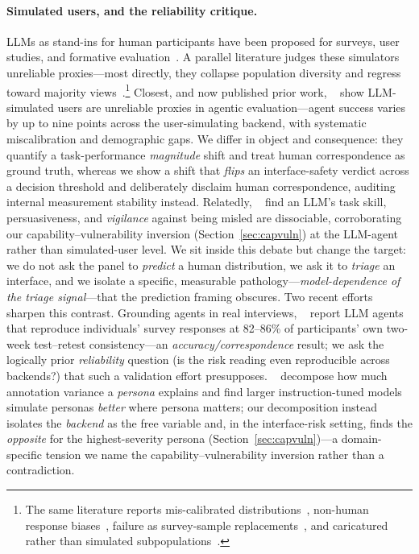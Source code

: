 \documentclass[manuscript,nonacm]{acmart}
\begin{document}
\paragraph{Simulated users, and the reliability critique.} LLMs as stand-ins for human participants have
been proposed for surveys, user studies, and formative
evaluation~\cite{park2022social,argyle2023out,aher2023using}. A parallel literature judges these simulators
unreliable proxies---most directly, they collapse population diversity and regress toward majority
views~\cite{santurkar2023whose}.\footnote{The same literature reports mis-calibrated
distributions~\cite{cao2025specializing,dominguez2024questioning}, non-human response
biases~\cite{tjuatja2024llms}, failure as survey-sample replacements~\cite{bisbee2024synthetic}, and
caricatured rather than simulated subpopulations~\cite{cheng2023compost}.} Closest, and now published prior work,
\citeauthor{seshadri2026lost}~\cite{seshadri2026lost} show LLM-simulated users are unreliable proxies in
agentic evaluation---agent success varies by up to nine points across the user-simulating backend, with
systematic miscalibration and demographic gaps. We differ in object and consequence: they quantify a
task-performance \emph{magnitude} shift and treat human correspondence as ground truth, whereas we show a
shift that \emph{flips} an interface-safety verdict across a decision threshold and deliberately disclaim
human correspondence, auditing internal measurement stability instead. Relatedly,
\citeauthor{robinson2026influence}~\cite{robinson2026influence} find an LLM's task skill, persuasiveness, and
\emph{vigilance} against being misled are dissociable, corroborating our capability--vulnerability inversion
(Section~\ref{sec:capvuln}) at the LLM-agent rather than simulated-user level. We sit inside this debate but change the
target: we do not ask the panel to \emph{predict} a human distribution, we ask it to \emph{triage} an
interface, and we isolate a specific, measurable pathology---\emph{model-dependence of the triage
signal}---that the prediction framing obscures. Two recent efforts sharpen this contrast. Grounding agents
in real interviews, \citeauthor{park2024generative}~\cite{park2024generative} report LLM agents that
reproduce individuals' survey responses at 82--86\% of participants' own two-week test--retest
consistency---an \emph{accuracy/correspondence}
result; we ask the logically prior \emph{reliability} question (is the risk reading even reproducible across
backends?) that such a validation effort presupposes. \citeauthor{hu2024quantifying}~\cite{hu2024quantifying}
decompose how much annotation variance a \emph{persona} explains and find larger instruction-tuned models
simulate personas \emph{better} where persona matters; our decomposition instead isolates the \emph{backend}
as the free variable and, in the interface-risk setting, finds the \emph{opposite} for the highest-severity
persona (Section~\ref{sec:capvuln})---a domain-specific tension we name the capability--vulnerability
inversion rather than a contradiction.
\end{document}
